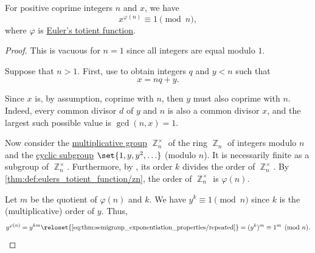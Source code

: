 \begin{theorem}\label{thm:eulers_totient_theorem}
  For positive coprime integers \( n \) and \( x \), we have
  \begin{equation*}
    x^{\varphi(n)} \equiv 1 \pmod n,
  \end{equation*}
  where \( \varphi \) is \hyperref[def:eulers_totient_function]{Euler's totient function}.
\end{theorem}
\begin{proof}
  This is vacuous for \( n = 1 \) since all integers are equal modulo \( 1 \).

  Suppose that \( n > 1 \). First, use  to obtain integers \( q \) and \( y < n \) such that
  \begin{equation*}
    x = nq + y.
  \end{equation*}

  Since \( x \) is, by assumption, coprime with \( n \), then \( y \) must also coprime with \( n \). Indeed, every common divisor \( d \) of \( y \) and \( n \) is also a common divisor \( x \), and the largest such possible value is \( \gcd(n, x) = 1 \).

  Now consider the \hyperref[def:semiring]{multiplicative group} \( \BbbZ_n^\times \) of the ring \hyperref[def:ring_of_integers_modulo]{\( \BbbZ_n \)} of integers modulo \( n \) and the \hyperref[def:cyclic_group]{cyclic subgroup} \( \set{ 1, y, y^2, \ldots } \) (modulo \( n \)). It is necessarily finite as a subgroup of \( \BbbZ_n^\times \). Furthermore, by , its order \( k \) divides the order of \( \BbbZ_n^\times \). By \cref{thm:def:eulers_totient_function/zn}, the order of \( \BbbZ_n^\times \) is \( \varphi(n) \).

  Let \( m \) be the quotient of \( \varphi(n) \) and \( k \). We have \( y^k \equiv 1 \pmod n \) since \( k \) is the (multiplicative) order of \( y \). Thus,
  \begin{equation*}
    y^{\varphi(n)}
    =
    y^{km}
    \reloset {\eqref{eq:thm:semigroup_exponentiation_properties/repeated}} =
    (y^k)^m
    \equiv
    1^m
    \pmod n.
  \end{equation*}
\end{proof}


